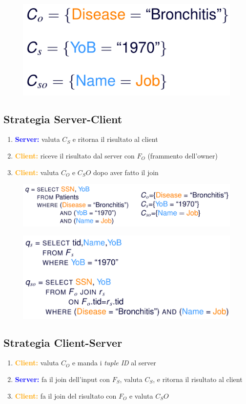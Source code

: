 \documentclass{report}
\begin{document}
\begin{figure}[ht]
    \centering
    \includegraphics[width=0.4\linewidth]{images/fragmentation/query-ex.png}
\end{figure}


\subsection{Strategia Server-Client}
\begin{enumerate}
    \item \textcolor{blue}{\textbf{Server:}} valuta $C_S$ e ritorna il risultato al client 
    \item \textcolor{orange}{\textbf{Client:}} riceve il risultato dal server con $F_O$ (frammento dell'owner)
    \item \textcolor{orange}{\textbf{Client:}} valuta $C_O$ e $C_SO$ dopo aver fatto il join 
\end{enumerate}

\begin{figure}[ht]
    \centering
    \includegraphics[width=0.9\linewidth]{images/fragmentation/sc-1.png}
\end{figure}

\begin{figure}[ht]
    \centering
    \includegraphics[width=0.8\linewidth]{images/fragmentation/sc-2.png}
\end{figure}

\subsection{Strategia Client-Server}
\begin{enumerate}
    \item \textcolor{orange}{\textbf{Client:}} valuta $C_O$ e manda i \textit{tuple ID} al server 
    \item \textcolor{blue}{\textbf{Server:}} fa il join dell'input con $F_S$, valuta $C_S$, e ritorna il risultato al client 
    \item \textcolor{orange}{\textbf{Client:}} fa il join del risultato con $F_O$ e valuta $C_SO$
\end{enumerate}
\end{document}
